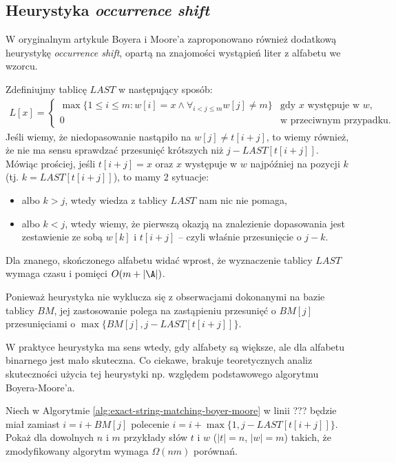 \subsection{Heurystyka \emph{occurrence shift}}

W oryginalnym artykule Boyera i Moore'a zaproponowano również dodatkową heurystykę \emph{occurrence shift}, opartą na znajomości wystąpień liter z alfabetu we wzorcu.

Zdefiniujmy tablicę $LAST$ w następujący sposób:
\begin{align*}
  L[x] =
  \begin{cases}
    \max \{1 \le i \le m: w[i] = x \land \forall_{i < j \le m} w[j] \neq m\} & \text{gdy $x$ występuje w $w$}, \\
    0 & \text{w przeciwnym przypadku}.
  \end{cases}
\end{align*}
Jeśli wiemy, że niedopasowanie nastąpiło na $w[j] \neq t[i + j]$, to wiemy również, że nie ma sensu sprawdzać przesunięć krótszych niż $j - LAST[t[i + j]]$. Mówiąc prościej, jeśli $t[i + j] = x$ oraz $x$ występuje w $w$ najpóźniej na pozycji $k$ (tj. $k = LAST[t[i + j]]$), to mamy 2 sytuacje:
\begin{itemize}
  \item albo $k > j$, wtedy wiedza z tablicy $LAST$ nam nic nie pomaga,
  \item albo $k < j$, wtedy wiemy, że pierwszą okazją na znalezienie dopasowania jest zestawienie ze sobą $w[k]$ i $t[i + j]$ -- czyli właśnie przesunięcie o $j - k$.
\end{itemize}
Dla znanego, skończonego alfabetu widać wprost, że wyznaczenie tablicy $LAST$ wymaga czasu i pomięci $O(m + |\A|)$.

Ponieważ heurystyka nie wyklucza się z obserwacjami dokonanymi na bazie tablicy $BM$, jej zastosowanie polega na zastąpieniu przesunięć o $BM[j]$ przesunięciami o $\max\{BM[j], j - LAST[t[i + j]]\}$.

W praktyce heurystyka ma sens wtedy, gdy alfabety są większe, ale dla alfabetu binarnego jest mało skuteczna.
Co ciekawe, brakuje teoretycznych analiz skuteczności użycia tej heurystyki np. względem podstawowego algorytmu Boyera-Moore'a.

\begin{problem}{}{}
  Niech w Algorytmie \ref{alg:exact-string-matching-boyer-moore} w linii ??? będzie miał zamiast $i = i + BM[j]$ polecenie $i = i + \max\{1, j - LAST[t[i + j]]\}$.
  Pokaż dla dowolnych $n$ i $m$ przykłady słów $t$ i $w$ ($|t| = n$, $|w| = m$) takich, że zmodyfikowany algorytm wymaga $\Omega(n m)$ porównań.
\end{problem}

